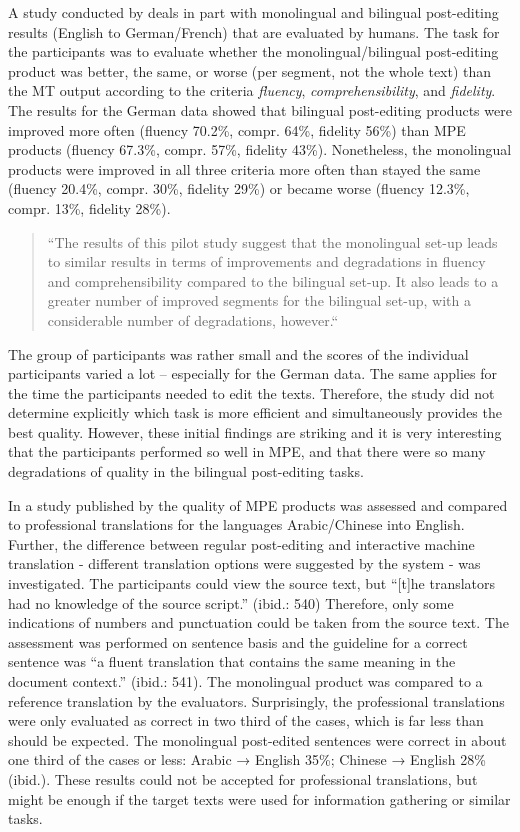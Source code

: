\documentclass[output=paper]{langsci/langscibook}
\begin{document}
A study conducted by \citet{mitchell2013} deals in part with monolingual and bilingual post-editing results (English to German/French) that are evaluated by humans. The task for the participants was to evaluate whether the monolingual/bilingual post-editing product was better, the same, or worse (per segment, not the whole text) than the MT output according to the criteria \textit{fluency}, \textit{comprehensibility}, and \textit{fidelity}. The results for the German data showed that bilingual post-editing products were improved more often (fluency 70.2\%, compr. 64\%, fidelity 56\%) than MPE products (fluency 67.3\%, compr. 57\%, fidelity 43\%). Nonetheless, the monolingual products were improved in all three criteria more often than stayed the same (fluency 20.4\%, compr. 30\%, fidelity 29\%) or became worse (fluency 12.3\%, compr. 13\%, fidelity 28\%).


\begin{quotation}
“The results of this pilot study suggest that the monolingual set-up leads to similar results in terms of improvements and degradations in fluency and comprehensibility compared to the bilingual set-up. It also leads to a greater number of improved segments for the bilingual set-up, with a considerable number of degradations, however.“ \citep[pg. 4]{mitchell2013}\end{quotation}

The group of participants was rather small and the scores of the individual participants varied a lot – especially for the German data. The same applies for the time the participants needed to edit the texts. Therefore, the study did not determine explicitly which task is more efficient and simultaneously provides the best quality. However, these initial findings are striking and it is very interesting that the participants performed so well in MPE, and that there were so many degradations of quality in the bilingual post-editing tasks.



In a study published by \citet{Koehn2010} the quality of MPE products was assessed and compared to professional translations for the languages Arabic/Chinese into English. Further, the difference between regular post-editing and interactive machine translation - different translation options were suggested by the system - was investigated. The participants could view the source text, but “[t]he translators had no knowledge of the source script.” (ibid.: 540) Therefore, only some indications of numbers and punctuation could be taken from the source text. The assessment was performed on sentence basis and the guideline for a correct sentence was “a fluent translation that contains the same meaning in the document context.” (ibid.: 541). The monolingual product was compared to a reference translation by the evaluators. Surprisingly, the professional translations were only evaluated as correct in two third of the cases, which is far less than should be expected. The monolingual post-edited sentences were correct in about one third of the cases or less: Arabic → English 35\%; Chinese → English 28\% (ibid.). These results could not be accepted for professional translations, but might be enough if the target texts were used for information gathering or similar tasks.
\end{document}
